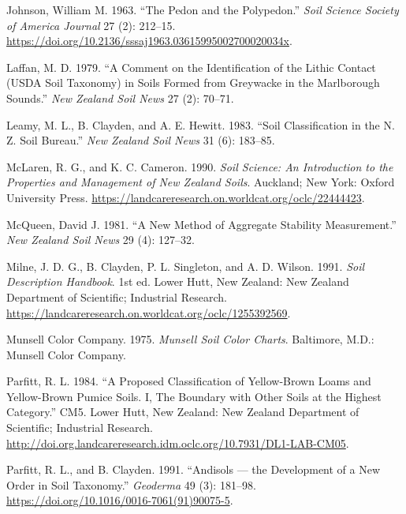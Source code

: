 \documentclass[
  letterpaper,
  DIV=11,
  numbers=noendperiod]{scrreprt}
\newlength{\cslhangindent}
\newlength{\cslentryspacingunit} %
\newenvironment{CSLReferences}[2] %
 {%
  \setlength{\parindent}{0pt}
  \ifodd #1
  \let\oldpar\par
  \def\par{\hangindent=\cslhangindent\oldpar}
  \fi
  \setlength{\parskip}{#2\cslentryspacingunit}
 }%
 {}
\begin{document}
\begin{CSLReferences}{1}{0}
\leavevmode{}%
Johnson, William M. 1963. {``The {Pedon} and the {Polypedon}.''}
\emph{Soil Science Society of America Journal} 27 (2): 212--15.
\url{https://doi.org/10.2136/sssaj1963.03615995002700020034x}.

\leavevmode{}%
Laffan, M. D. 1979. {``A Comment on the Identification of the Lithic
Contact ({USDA} {Soil} {Taxonomy}) in Soils Formed from Greywacke in the
{Marlborough} {Sounds}.''} \emph{New Zealand Soil News} 27 (2): 70--71.

\leavevmode{}%
Leamy, M. L., B. Clayden, and A. E. Hewitt. 1983. {``Soil
{Classification} in the {N}. {Z}. {Soil} {Bureau}.''} \emph{New Zealand
Soil News} 31 (6): 183--85.

\leavevmode{}%
McLaren, R. G., and K. C. Cameron. 1990. \emph{Soil Science: An
Introduction to the Properties and Management of {New} {Zealand} Soils}.
Auckland; New York: Oxford University Press.
\url{https://landcareresearch.on.worldcat.org/oclc/22444423}.

\leavevmode{}%
McQueen, David J. 1981. {``A New Method of Aggregate Stability
Measurement.''} \emph{New Zealand Soil News} 29 (4): 127--32.

\leavevmode{}%
Milne, J. D. G., B. Clayden, P. L. Singleton, and A. D. Wilson. 1991.
\emph{Soil Description Handbook}. 1st ed. Lower Hutt, New Zealand: New
Zealand Department of Scientific; Industrial Research.
\url{https://landcareresearch.on.worldcat.org/oclc/1255392569}.

\leavevmode{}%
Munsell Color Company. 1975. \emph{Munsell {Soil} {Color} {Charts}}.
Baltimore, M.D.: Munsell Color Company.

\leavevmode{}%
Parfitt, R. L. 1984. {``A Proposed Classification of Yellow-Brown Loams
and Yellow-Brown Pumice Soils. {I}, {The} Boundary with Other Soils at
the Highest Category.''} CM5. Lower Hutt, New Zealand: New Zealand
Department of Scientific; Industrial Research.
\url{http://doi.org.landcareresearch.idm.oclc.org/10.7931/DL1-LAB-CM05}.

\leavevmode{}%
Parfitt, R. L., and B. Clayden. 1991. {``Andisols --- the Development of
a New Order in {Soil} {Taxonomy}.''} \emph{Geoderma} 49 (3): 181--98.
\url{https://doi.org/10.1016/0016-7061(91)90075-5}.


\end{CSLReferences}
\end{document}
